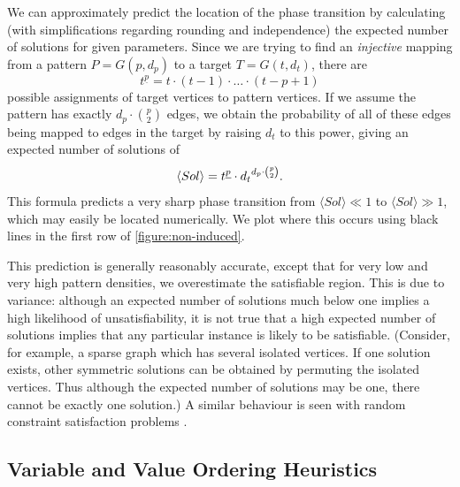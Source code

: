 \documentclass[twoside,11pt]{article}
\newcommand{\citep}[1]{\cite{#1}}
\begin{document}
We can approximately predict the location of the phase transition by calculating (with
simplifications regarding rounding and independence) the expected number of solutions for given
parameters. Since we are trying to find an \emph{injective} mapping from a pattern $P = G(p, d_p)$
to a target $T = G(t, d_t)$, there are \[ t^{\underline{p}} = t \cdot (t - 1) \cdot \ldots \cdot (t -
p + 1) \] possible assignments of target vertices to pattern vertices.  If we assume the pattern
has exactly $d_p \cdot \binom{p}{2}$ edges, we obtain the probability of all of these edges being mapped to
edges in the target by raising $d_t$ to this power, giving an expected number of solutions of
\begin{equation}\label{equation:non-induced-prediction}
    \langle Sol \rangle = t^{\underline{p}} \cdot {d_t}^{d_p \cdot \binom{p}{2}} \textnormal{.}
\end{equation} This
formula predicts a very sharp phase transition from $\langle Sol \rangle \ll 1$ to $\langle Sol
\rangle \gg 1$, which may easily be located numerically. We plot where this occurs using black lines
in the first row of \cref{figure:non-induced}.

This prediction is generally reasonably accurate, except that for very low and very high pattern
densities, we overestimate the satisfiable region. This is due to variance: although an expected
number of solutions much below one implies a high likelihood of unsatisfiability, it is not true
that a high expected number of solutions implies that any particular instance is likely to be
satisfiable. (Consider, for example, a sparse graph which has several isolated vertices. If one
solution exists, other symmetric solutions can be obtained by permuting the isolated vertices.
Thus although the expected number of solutions may be one, there cannot be exactly one solution.) A
similar behaviour is seen with random constraint satisfaction problems
\citep{DBLP:journals/ai/SmithD96}.

\subsection{Variable and Value Ordering Heuristics}
\end{document}
